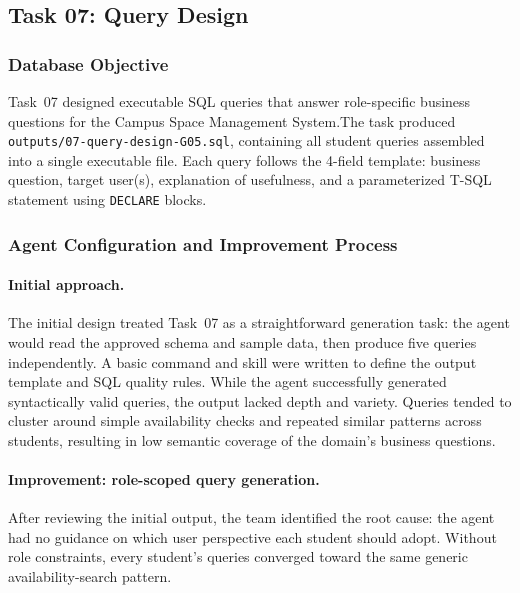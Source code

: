 \subsection{Task 07: Query Design}
\label{sec:task07}


\subsubsection{Database Objective}

Task~07 designed executable SQL queries that answer role-specific business
questions for the Campus Space Management System.The task produced \texttt{outputs/07-query-design-G05.sql}, containing all
student queries assembled into a single executable file. Each query follows the
4-field template: business question, target user(s), explanation of usefulness,
and a parameterized T-SQL statement using \texttt{DECLARE} blocks.

\subsubsection{Agent Configuration and Improvement Process}

\paragraph{Initial approach.}
The initial design treated Task~07 as a straightforward generation task: the
agent would read the approved schema and sample data, then produce five queries
independently. A basic command and skill were written to define the output
template and SQL quality rules. While the agent successfully generated
syntactically valid queries, the output lacked depth and variety. Queries
tended to cluster around simple availability checks and repeated similar
patterns across students, resulting in low semantic coverage of the domain's
business questions.

\paragraph{Improvement: role-scoped query generation.}
After reviewing the initial output, the team identified the root cause: the
agent had no guidance on which user perspective each student should adopt.
Without role constraints, every student's queries converged toward the same
generic availability-search pattern.

